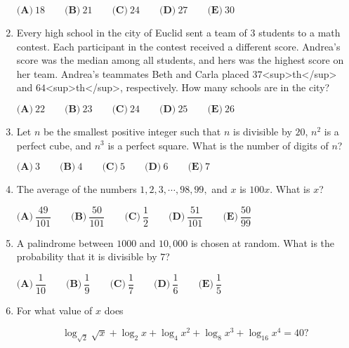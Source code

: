 \documentclass{article}
\begin{document}
\begin{enumerate}[label=\arabic*., itemsep=0.5em]
\(\textbf{(A)}\ 18 \qquad \textbf{(B)}\ 21 \qquad \textbf{(C)}\ 24 \qquad \textbf{(D)}\ 27 \qquad \textbf{(E)}\ 30\)\par \vspace{0.5em}\item Every high school in the city of Euclid sent a team of \(3\) students to a math contest. Each participant in the contest received a different score. Andrea's score was the median among all students, and hers was the highest score on her team. Andrea's teammates Beth and Carla placed \(37\)<sup>th</sup> and \(64\)<sup>th</sup>, respectively. How many schools are in the city?

\(\textbf{(A)}\ 22 \qquad \textbf{(B)}\ 23 \qquad \textbf{(C)}\ 24 \qquad \textbf{(D)}\ 25 \qquad \textbf{(E)}\ 26\)\par \vspace{0.5em}\item Let \(n\) be the smallest positive integer such that \(n\) is divisible by \(20\), \(n^2\) is a perfect cube, and \(n^3\) is a perfect square. What is the number of digits of \(n\)?

\(\textbf{(A)}\ 3 \qquad \textbf{(B)}\ 4 \qquad \textbf{(C)}\ 5 \qquad \textbf{(D)}\ 6 \qquad \textbf{(E)}\ 7\)\par \vspace{0.5em}\item The average of the numbers \(1, 2, 3,\cdots, 98, 99,\) and \(x\) is \(100x\). What is \(x\)?

\(\textbf{(A)}\ \dfrac{49}{101} \qquad \textbf{(B)}\ \dfrac{50}{101} \qquad \textbf{(C)}\ \dfrac{1}{2} \qquad \textbf{(D)}\ \dfrac{51}{101} \qquad \textbf{(E)}\ \dfrac{50}{99}\)\par \vspace{0.5em}\item A palindrome between \(1000\) and \(10,000\) is chosen at random. What is the probability that it is divisible by \(7\)?

\(\textbf{(A)}\ \dfrac{1}{10} \qquad \textbf{(B)}\ \dfrac{1}{9} \qquad \textbf{(C)}\ \dfrac{1}{7} \qquad \textbf{(D)}\ \dfrac{1}{6} \qquad \textbf{(E)}\ \dfrac{1}{5}\)\par \vspace{0.5em}\item For what value of \(x\) does


\begin{equation*}
\log_{\sqrt{2}}\sqrt{x}+\log_{2}{x}+\log_{4}{x^2}+\log_{8}{x^3}+\log_{16}{x^4}=40?
\end{equation*}



\end{enumerate}
\end{document}
